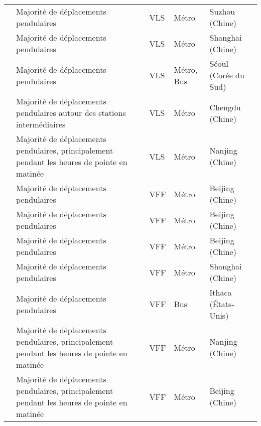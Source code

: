 \begin{longtable}{p{3cm}p{4cm}p{1.5cm}p{1.8cm}p{2.3cm}}
    \small{\textcite{gu_measuring_2019}}\index{Gu, Tianqi|pagebf} & \small{Majorité de déplacements pendulaires} & \small{VLS} & \small{Métro} & \small{Suzhou (Chine)}\\
    \small{\textcite{yu_policy_2021}}\index{Yu, Qing|pagebf} & \small{Majorité de déplacements pendulaires} & \small{VLS} & \small{Métro} & \small{Shanghai (Chine)}\\
    \small{\textcite{kim_analysis_2021}}\index{Kim, Minjun|pagebf} & \small{Majorité de déplacements pendulaires} & \small{VLS} & \small{Métro, Bus} & \small{Séoul (Corée du Sud)}\\
    \small{\textcite{bi_analysis_2021}}\index{Bi, Hui|pagebf} & \small{Majorité de déplacements pendulaires autour des stations intermédiaires} & \small{VLS} & \small{Métro} & \small{Chengdu (Chine)}\\
    \small{\textcite{liu_understanding_2020}}\index{Liu, Yang|pagebf} & \small{Majorité de déplacements pendulaires, principalement pendant les heures de pointe en matinée} & \small{VLS} & \small{Métro} & \small{Nanjing (Chine)}\\
    \small{\textcite{fan_dockless_2020}}\index{Fan, Yichun|pagebf} & \small{Majorité de déplacements pendulaires} & \small{VFF} & \small{Métro} & \small{Beijing (Chine)}\\
    \small{\textcite{wang_spatiotemporal_2020}}\index{Wang, Zijia|pagebf} & \small{Majorité de déplacements pendulaires} & \small{VFF} & \small{Métro} & \small{Beijing (Chine)}\\
    \small{\textcite{yu_understanding_2021}}\index{Yu, Senbin|pagebf} & \small{Majorité de déplacements pendulaires} & \small{VFF} & \small{Métro} & \small{Beijing (Chine)}\\
    \small{\textcite{lin_analysis_2019}}\index{Lin, Diao|pagebf} & \small{Majorité de déplacements pendulaires} & \small{VFF} & \small{Métro} & \small{Shanghai (Chine)}\\
    \small{\textcite{qiu_interplay_2021}}\index{Qiu, Waishan|pagebf} & \small{Majorité de déplacements pendulaires} & \small{VFF} & \small{Bus} & \small{Ithaca (États-Unis)}\\
    \small{\textcite{yang_spatiotemporal_2019}}\index{Yang, Yuanxuan|pagebf} & \small{Majorité de déplacements pendulaires, principalement pendant les heures de pointe en matinée} & \small{VFF} & \small{Métro} & \small{Nanjing (Chine)}\\
    \small{\textcite{liu_concordance_2022}}\index{Liu, Siyang|pagebf} & \small{Majorité de déplacements pendulaires, principalement pendant les heures de pointe en matinée} & \small{VFF} & \small{Métro} & \small{Beijing (Chine)}\\

\end{longtable}
